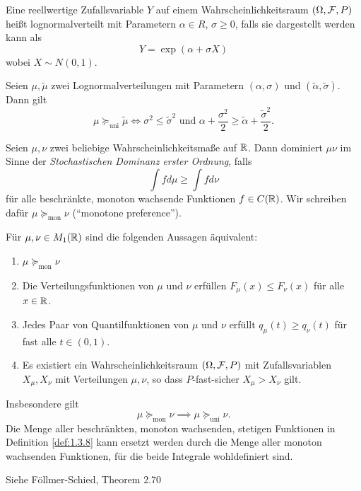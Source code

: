 \documentclass[a4paper,twoside,DIV15,BCOR12mm]{scrbook}
\newcommand{\unisucceq}{\succeq_{\text{uni}}}
\newcommand{\monsucceq}{\succeq_{\text{mon}}}
\begin{document}
\begin{definition}
Eine reellwertige Zufallsvariable $Y$ auf einem Wahrscheinlichkeitsraum $(\Omega, \mathcal{F}, P)$ heißt lognormalverteilt mit Parametern $\alpha\in R$, $\sigma \ge 0$, falls sie dargestellt werden kann als 
\[
Y = \exp(\alpha  + \sigma X)
\]
wobei $X \sim N(0,1)$.
\end{definition}

\begin{satz}
Seien $\mu, \tilde\mu$ zwei Lognormalverteilungen mit Parametern $(\alpha,\sigma)$ und $(\tilde\alpha,\tilde\sigma)$. Dann gilt 
\[
\mu \unisucceq \tilde\mu \iff \sigma^2 \le \tilde\sigma^2 \text{ und } \alpha + \frac{\sigma^2}2 \ge \tilde\alpha + \frac{\tilde\sigma^2}2.
\]
\end{satz}

\begin{definition}
\label{def:1.3.8}Seien $\mu,\nu$ zwei beliebige Wahrscheinlichkeitsmaße auf $\mathbb{R}$. Dann dominiert $\mu \nu$ im Sinne der \emph{Stochastischen Dominanz erster Ordnung}, falls 
\[
\int f d\mu \ge \int fd\nu
\]
für alle beschränkte, monoton wachsende Funktionen $f\in C(\mathbb{R})$. Wir schreiben dafür $\mu\monsucceq \nu$ (“monotone preference”).
\end{definition}

\begin{satz}
\label{satz:1.3.9}Für $\mu,\nu \in M_1(\mathbb{R})$ sind die folgenden Aussagen äquivalent:
\begin{enumerate}
\item $\mu\monsucceq\nu$
\item Die Verteilungsfunktionen von $\mu$ und $\nu$ erfüllen $F_\mu(x) \le F_\nu(x)$ für alle $x\in\mathbb{R}$.
\item Jedes Paar von Quantilfunktionen von $\mu$ und $\nu$ erfüllt $q_\mu(t) \ge q_\nu(t)$ für fast alle $t\in(0,1)$.
\item Es existiert ein Wahrscheinlichkeitsraum $(\Omega,\mathcal{F}, P)$ mit Zufallsvariablen $X_\mu, X_\nu$ mit Verteilungen $\mu, \nu$, so dass $P$-fast-sicher $X_\mu > X_\nu$ gilt.
\end{enumerate}
Insbesondere gilt \[
\mu\monsucceq\nu \implies \mu\unisucceq\nu.
\]
Die Menge aller beschränkten, monoton wachsenden, stetigen Funktionen in Definition \ref{def:1.3.8} kann ersetzt werden durch die Menge aller monoton wachsenden Funktionen, für die beide Integrale wohldefiniert sind.
\end{satz}

\begin{beweis}
Siehe Föllmer-Schied, Theorem 2.70
\end{beweis}
\end{document}
